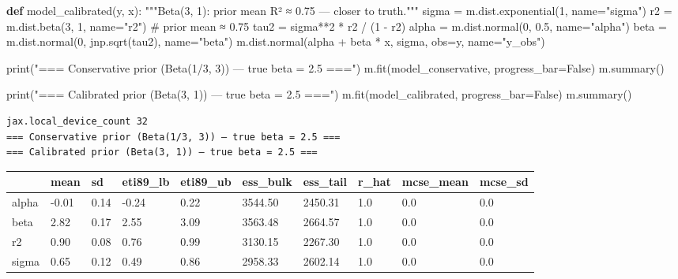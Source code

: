 \documentclass[
  letterpaper,
  DIV=11,
  numbers=noendperiod]{scrartcl}
\newenvironment{Shaded}{\begin{snugshade}}{\end{snugshade}}
\newcommand{\BuiltInTok}[1]{\textcolor[rgb]{0.00,0.23,0.31}{#1}}
\newcommand{\CommentTok}[1]{\textcolor[rgb]{0.37,0.37,0.37}{#1}}
\newcommand{\DecValTok}[1]{\textcolor[rgb]{0.68,0.00,0.00}{#1}}
\newcommand{\FloatTok}[1]{\textcolor[rgb]{0.68,0.00,0.00}{#1}}
\newcommand{\KeywordTok}[1]{\textcolor[rgb]{0.00,0.23,0.31}{\textbf{#1}}}
\newcommand{\NormalTok}[1]{\textcolor[rgb]{0.00,0.23,0.31}{#1}}
\newcommand{\OperatorTok}[1]{\textcolor[rgb]{0.37,0.37,0.37}{#1}}
\newcommand{\StringTok}[1]{\textcolor[rgb]{0.13,0.47,0.30}{#1}}
\newcommand{\VariableTok}[1]{\textcolor[rgb]{0.07,0.07,0.07}{#1}}
\begin{document}
\begin{Shaded}
\begin{Highlighting}[]
\KeywordTok{def}\NormalTok{ model\_calibrated(y, x):}
    \CommentTok{"""Beta(3, 1): prior mean R² ≈ 0.75 — closer to truth."""}
\NormalTok{    sigma }\OperatorTok{=}\NormalTok{ m.dist.exponential(}\DecValTok{1}\NormalTok{, name}\OperatorTok{=}\StringTok{"sigma"}\NormalTok{)}
\NormalTok{    r2    }\OperatorTok{=}\NormalTok{ m.dist.beta(}\DecValTok{3}\NormalTok{, }\DecValTok{1}\NormalTok{, name}\OperatorTok{=}\StringTok{"r2"}\NormalTok{)           }\CommentTok{\# prior mean ≈ 0.75}
\NormalTok{    tau2  }\OperatorTok{=}\NormalTok{ sigma}\OperatorTok{**}\DecValTok{2} \OperatorTok{*}\NormalTok{ r2 }\OperatorTok{/}\NormalTok{ (}\DecValTok{1} \OperatorTok{{-}}\NormalTok{ r2)}
\NormalTok{    alpha }\OperatorTok{=}\NormalTok{ m.dist.normal(}\DecValTok{0}\NormalTok{, }\FloatTok{0.5}\NormalTok{, name}\OperatorTok{=}\StringTok{"alpha"}\NormalTok{)}
\NormalTok{    beta  }\OperatorTok{=}\NormalTok{ m.dist.normal(}\DecValTok{0}\NormalTok{, jnp.sqrt(tau2), name}\OperatorTok{=}\StringTok{"beta"}\NormalTok{)}
\NormalTok{    m.dist.normal(alpha }\OperatorTok{+}\NormalTok{ beta }\OperatorTok{*}\NormalTok{ x, sigma, obs}\OperatorTok{=}\NormalTok{y, name}\OperatorTok{=}\StringTok{"y\_obs"}\NormalTok{)}

\BuiltInTok{print}\NormalTok{(}\StringTok{"=== Conservative prior (Beta(1/3, 3)) — true beta = 2.5 ==="}\NormalTok{)}
\NormalTok{m.fit(model\_conservative, progress\_bar}\OperatorTok{=}\VariableTok{False}\NormalTok{)}
\NormalTok{m.summary()}

\BuiltInTok{print}\NormalTok{(}\StringTok{"=== Calibrated prior (Beta(3, 1)) — true beta = 2.5 ==="}\NormalTok{)}
\NormalTok{m.fit(model\_calibrated, progress\_bar}\OperatorTok{=}\VariableTok{False}\NormalTok{)}
\NormalTok{m.summary()}
\end{Highlighting}
\end{Shaded}

\begin{verbatim}
jax.local_device_count 32
=== Conservative prior (Beta(1/3, 3)) — true beta = 2.5 ===
=== Calibrated prior (Beta(3, 1)) — true beta = 2.5 ===
\end{verbatim}

\begin{longtable}[]{@{}llllllllll@{}}
\toprule\noalign{}
& mean & sd & eti89\_lb & eti89\_ub & ess\_bulk & ess\_tail & r\_hat &
mcse\_mean & mcse\_sd \\
\midrule\noalign{}
\endhead
\bottomrule\noalign{}
\endlastfoot
alpha & -0.01 & 0.14 & -0.24 & 0.22 & 3544.50 & 2450.31 & 1.0 & 0.0 &
0.0 \\
beta & 2.82 & 0.17 & 2.55 & 3.09 & 3563.48 & 2664.57 & 1.0 & 0.0 &
0.0 \\
r2 & 0.90 & 0.08 & 0.76 & 0.99 & 3130.15 & 2267.30 & 1.0 & 0.0 & 0.0 \\
sigma & 0.65 & 0.12 & 0.49 & 0.86 & 2958.33 & 2602.14 & 1.0 & 0.0 &
0.0 \\
\end{longtable}
\end{document}
